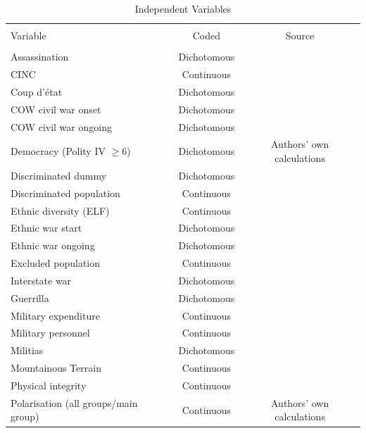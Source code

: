 \documentclass[a4paper,12pt]{article}
\begin{document}
\begin{table}[!htbp] \centering 
  \caption{Independent Variables} 
  \label{tab:mk-vs} 
\footnotesize
\begin{tabular}{@{\extracolsep{5pt}}lcc} 
\\[-1.8ex]\hline 
\hline \\[-1.8ex] {Variable} & \multicolumn{1}{c}{Coded} & \multicolumn{1}{c}{Source}\\ 
\hline \\[-1.8ex] 
Assassination & Dichotomous & \citet{banks1999cross} \\ 
CINC & Continuous & \citet{cow2017cinc}\\ 
Coup d'état & Dichotomous & \citet{marshall2017pitf}  \\ 
COW civil war onset & Dichotomous & \citet{cow2017cinc,singer1988reconstructing} \\ 
COW civil war ongoing & Dichotomous & \citet{cow2017cinc,singer1988reconstructing} \\ 
Democracy (Polity IV $\geq 6$) & Dichotomous  & Authors' own calculations \\ 
Discriminated dummy & Dichotomous & \citet{cederman2010ethnic}\\ 
Discriminated population & Continuous & \citet{cederman2010ethnic} \\ 
Ethnic diversity (ELF) & Continuous & \citet{fearon2003ethnicity} \\ 
Ethnic war start & Dichotomous & \citet{cederman2010ethnic} \\ 
Ethnic war ongoing & Dichotomous & \citet{cederman2010ethnic} \\ 
Excluded population & Continuous & \citet{cederman2010ethnic} \\ 
Interstate war & Dichotomous & \citet{singer1988reconstructing,cow2017cinc} \\ 
Guerrilla & Dichotomous & \citet{balcells2014does}\\ 
Military expenditure & Continuous & \citet{cow2017cinc} \\ 
Military personnel & Continuous & \citet{cow2017cinc} \\ 
Militias & Dichotomous & \citet{carey2013states} \\ 
Mountainous Terrain & Continuous & \citet{fearon2003ethnicity} \\ 
Physical integrity & Continuous & \citet{cingranelli2010cingranelli}\\ 
Polarisation (all groups/main group) & Continuous &  Authors' own calculations \\ 

\end{tabular}
\end{table}
\end{document}
